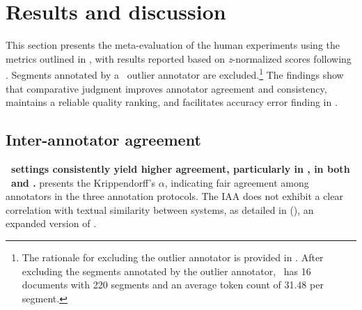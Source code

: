 \section{Results and discussion}\label{sec:results_and_discussion}

This section presents the meta-evaluation of the human experiments using the metrics outlined in , with results reported based on \textit{z}-normalized scores following \citet{riley-etal-2024-finding}. Segments annotated by a \ZhEn~outlier annotator are excluded.\footnote{The rationale for excluding the outlier annotator is provided in . After excluding the segments annotated by the outlier annotator, \ZhEn~has 16 documents with 220 segments and an average token count of 31.48 per segment.} The findings show that comparative judgment improves annotator agreement and consistency, maintains a reliable quality ranking, and facilitates accuracy error finding in \ZhEn.

\subsection{Inter-annotator agreement}\label{sec:annotator_agreement}

\textbf{\sxs~settings consistently yield higher agreement, particularly in \sxsmqm, in both \ZhEn~and \EnDe.}  presents the Krippendorff's $\alpha$, indicating fair agreement among annotators in the three annotation protocols. The IAA does not exhibit a clear correlation with textual similarity between systems, as detailed in   (), an expanded version of .

\begin{table}[htbp]
    \fontsize{5}{6}\selectfont
    \centering
    \caption{Krippendorff's $\alpha$ in three annotation settings. The annotators in each setting achieve a fair agreement.
    }
    \label{tab:inter-AA}
    \vspace{-5pt}
\end{table}

